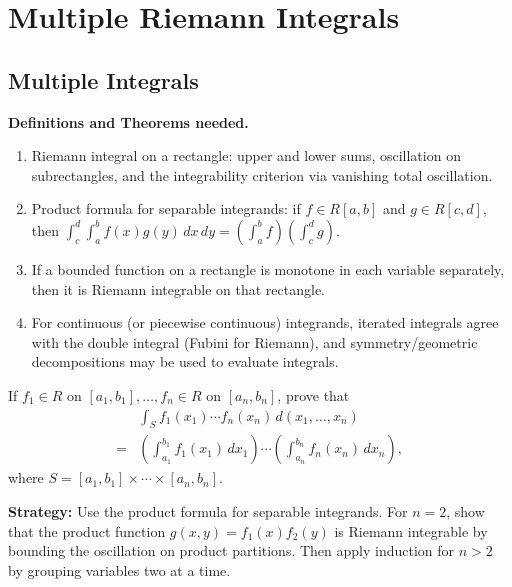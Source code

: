 \chapter{Multiple Riemann Integrals}
\section{Multiple Integrals}
\noindent\textbf{Definitions and Theorems needed.}
\begin{enumerate}[label=(\roman*)]
    \item Riemann integral on a rectangle: upper and lower sums, oscillation on subrectangles, and the integrability criterion via vanishing total oscillation.
    \item Product formula for separable integrands: if $f \in R[a,b]$ and $g \in R[c,d]$, then $\int_c^d \! \int_a^b f(x)g(y)\,dx\,dy = \left(\int_a^b f\right)\!\left(\int_c^d g\right)$.
    \item If a bounded function on a rectangle is monotone in each variable separately, then it is Riemann integrable on that rectangle.
    \item For continuous (or piecewise continuous) integrands, iterated integrals agree with the double integral (Fubini for Riemann), and symmetry/geometric decompositions may be used to evaluate integrals.
\end{enumerate}



\begin{problembox}
If \( f_1 \in R \) on \([a_1, b_1], \ldots, f_n \in R \) on \([a_n, b_n]\), prove that
\begin{align*}
 &\int_{S} f_1(x_1) \cdots f_n(x_n) \, d(x_1, \ldots, x_n) \\
 =& \left( \int_{a_1}^{b_1} f_1(x_1) \, dx_1 \right) \cdots \left( \int_{a_n}^{b_n} f_n(x_n) \, dx_n \right), 
\end{align*}
 where \( S = [a_1, b_1] \times \cdots \times [a_n, b_n] \).
\end{problembox}

\noindent\textbf{Strategy:} Use the product formula for separable integrands. For $n=2$, show that the product function $g(x,y)=f_1(x)f_2(y)$ is Riemann integrable by bounding the oscillation on product partitions. Then apply induction for $n>2$ by grouping variables two at a time.

